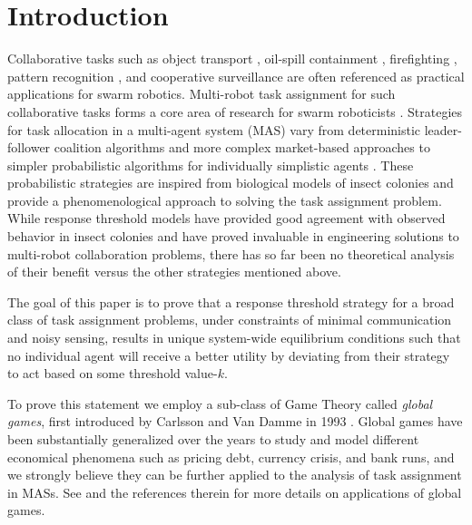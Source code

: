 \documentclass[conference]{ieeeconf}
\begin{document}
\section{Introduction}\label{sec:intro}
Collaborative tasks such as object transport \cite{Sugawara2012}, oil-spill containment \cite{Beni2005}, firefighting \cite{Krishnanand2006}, pattern recognition \cite{Beni1993}, and cooperative surveillance are often referenced as practical applications for swarm robotics. Multi-robot task assignment for such collaborative tasks forms a core area of research for swarm roboticists \cite{Gerkey2004}. Strategies for task allocation in a multi-agent system (MAS) vary from deterministic leader-follower coalition algorithms \cite{Chen2011} and more complex market-based approaches \cite{Amstutz2008,Vig2007} to simpler probabilistic algorithms for individually simplistic agents \cite{Dantu2012}. These probabilistic strategies are inspired from biological models of insect colonies and provide a phenomenological approach to solving the task assignment problem. While response threshold models have provided good agreement with observed behavior in insect colonies and have proved invaluable in engineering solutions to multi-robot collaboration problems, there has so far been no theoretical analysis of their benefit versus the other strategies mentioned above.

The goal of this paper is to prove that a response threshold strategy for a broad class of task assignment problems, under constraints of minimal communication and noisy sensing, results in unique system-wide equilibrium conditions such that no individual agent will receive a better utility by deviating from their strategy to act based on some threshold value-$k$. 

To prove this statement we employ a sub-class of Game Theory called \emph{global games}, first introduced by Carlsson and Van Damme in 1993 \cite{Carlsson1993}. Global games have been substantially generalized over the years to study and model different economical phenomena such as pricing debt, currency crisis, and bank runs, and we strongly believe they can be further applied to the analysis of task assignment in MASs. See \cite{Morris2000} and the references therein for more details on applications of global games.
\end{document}

